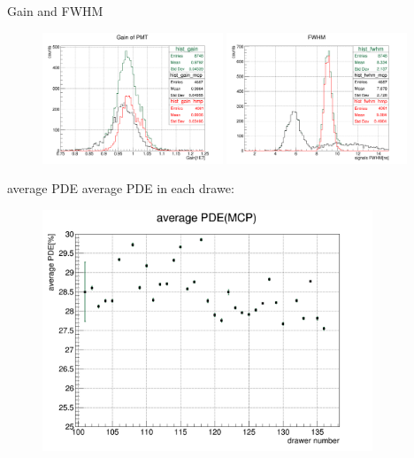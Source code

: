 \documentclass[11pt,compress,xcolor=x11names,UTF8]{beamer}
\begin{document}
\begin{frame}{Gain and FWHM}
\begin{figure}
\centering
\includegraphics[width=0.48\textwidth]{gain}
\includegraphics[width=0.48\textwidth]{fwhm}
\end{figure}
\end{frame}
\begin{frame}{average PDE}
average PDE in each drawe:
\begin{figure}
\centering
\includegraphics[width=0.88\textwidth]{dpde}
\end{figure}
\end{frame}
\end{document}
